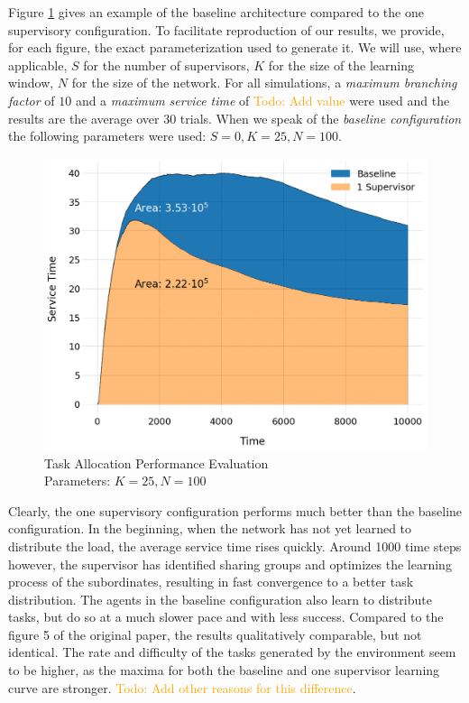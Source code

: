 \documentclass[letterpaper]{article}
\newcommand\todo[1]{\textcolor{orange}{Todo: #1}}
\begin{document}
Figure \ref{fig:areas} gives an example of the baseline architecture compared to the one supervisory configuration. To facilitate reproduction of our results, we provide, for each figure, the exact parameterization used to generate it. We will use, where applicable, $S$ for the number of supervisors, $K$ for the size of the learning window, $N$ for the size of the network. For all simulations, a \textit{maximum branching factor} of $10$ and a \textit{maximum service time} of \todo{Add value} were used and the results are the average over 30 trials. When we speak of the \textit{baseline configuration} the following parameters were used: $S=0,K=25,N=100$.
\begin{figure}[H]
 \begin{center}
  \includegraphics[width=\linewidth]{figures/figure5_light}
  \caption{Task Allocation Performance Evaluation\\Parameters: $K=25,N=100$}
  \label{fig:areas}
 \end{center}
\end{figure}

Clearly, the one supervisory configuration performs much better than the baseline configuration. In the beginning, when the network has not yet learned to distribute the load, the average service time rises quickly. Around 1000 time steps however, the supervisor has identified sharing groups and optimizes the learning process of the subordinates, resulting in fast convergence to a better task distribution. The agents in the baseline configuration also learn to distribute tasks, but do so at a much slower pace and with less success. Compared to the figure 5 of the original paper, the results qualitatively comparable, but not identical. The rate and difficulty of the tasks generated by the environment seem to be higher, as the maxima for both the baseline and one supervisor learning curve are stronger. \todo{Add other reasons for this difference}.
\end{document}
